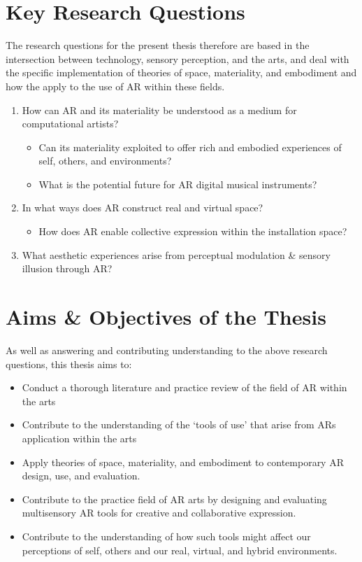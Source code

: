 \section{Key Research Questions}\label{sec: introduction-researchquestions}
The research questions for the present thesis therefore are based in the intersection between technology, sensory perception, and the arts, and deal with the specific implementation of theories of space, materiality, and embodiment and how the apply to the use of AR within these fields.

\begin{enumerate}
    \item How can AR and its materiality be understood as a medium for computational artists?
    \begin{itemize}
        \item Can its materiality exploited to offer rich and embodied experiences of self, others, and environments?
        \item What is the potential future for AR digital musical instruments?
    \end{itemize}
    \item In what ways does AR construct real and virtual space?
    \begin{itemize}
        \item How does AR enable collective expression within the installation space?
    \end{itemize}
    \item What aesthetic experiences arise from perceptual modulation \& sensory illusion through AR?
\end{enumerate}



\section{Aims \& Objectives of the Thesis}\label{sec: introduction-aims}
As well as answering and contributing understanding to the above research questions, this thesis aims to:

\begin{itemize}
    \item Conduct a thorough literature and practice review of the field of AR within the arts
    \item Contribute to the understanding of the `tools of use' that arise from ARs application within the arts
    \item Apply theories of space, materiality, and embodiment to contemporary AR design, use, and evaluation.
    \item Contribute to the practice field of AR arts by designing and evaluating multisensory AR tools for creative and collaborative expression.
    \item Contribute to the understanding of how such tools might affect our perceptions of self, others and our real, virtual, and hybrid environments. 
\end{itemize}



